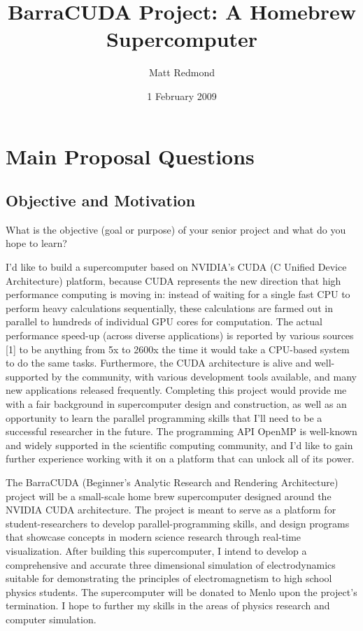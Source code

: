 \documentclass[10pt]{article}
\title{BarraCUDA Project: A Homebrew Supercomputer}  %
\author{Matt Redmond}      %
\date{1 February 2009}
\begin{document}
\maketitle
\tableofcontents
\clearpage

\section{Main Proposal Questions}
\subsection{Objective and Motivation}
What is the objective (goal or purpose) of your senior project and what do you hope to learn?

I'd like to build a supercomputer based on NVIDIA's CUDA (C Unified Device Architecture) platform, because CUDA represents the new direction that high performance computing is moving in: instead of waiting for a single fast CPU to perform heavy calculations sequentially, these calculations are farmed out in parallel to hundreds of individual GPU cores for computation. The actual performance speed-up (across diverse applications) is reported by various sources [1] to be anything from 5x to 2600x the time it would take a CPU-based system to do the same tasks.  Furthermore, the CUDA architecture is alive and well-supported by the community, with various development tools available, and many new applications released frequently. Completing this project would provide me with a fair background in supercomputer design and construction, as well as an opportunity to learn the parallel programming skills that I'll need to be a successful researcher in the future. The programming API OpenMP is well-known and widely supported in the scientific computing community, and I'd like to gain further experience working with it on a platform that can unlock all of its power. 

The BarraCUDA (Beginner's Analytic Research and Rendering Architecture) project will be a small-scale home brew supercomputer designed around the NVIDIA CUDA architecture. The project is meant to serve as a platform for student-researchers to develop parallel-programming skills, and design programs that showcase concepts in modern science research through real-time visualization. After building this supercomputer, I intend to develop a comprehensive and accurate three dimensional simulation of electrodynamics suitable for demonstrating the principles of electromagnetism to high school physics students. The supercomputer will be donated to Menlo upon the project's termination. I hope to further my skills in the areas of physics research and computer simulation.
\end{document}
